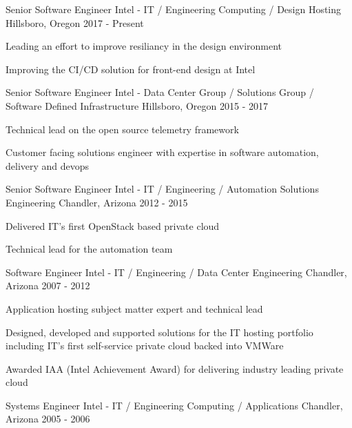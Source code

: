 \begin{cventries}
  \cventry
    {Senior Software Engineer}
    {Intel - IT / Engineering Computing / Design Hosting}
    {Hillsboro, Oregon}
    {2017 - Present}
    {
      \begin{cvitems}
        \item {Leading an effort to improve resiliancy in the design environment}
        \item {Improving the CI/CD solution for front-end design at Intel}
      \end{cvitems}
    }
  \cventry
    {Senior Software Engineer}
    {Intel - Data Center Group / Solutions Group / Software Defined Infrastructure}
    {Hillsboro, Oregon}
    {2015 - 2017}
    {
      \begin{cvitems}
        \item {Technical lead on the open source {} telemetry framework}
        \item {Customer facing solutions engineer with expertise in software automation, delivery and devops}
      \end{cvitems}
    }
  \cventry
    {Senior Software Engineer}
    {Intel - IT / Engineering / Automation Solutions Engineering }
    {Chandler, Arizona}
    {2012 - 2015}
    {
      \begin{cvitems}
	    \item {Delivered IT's first OpenStack based private cloud}
      \item {Technical lead for the automation team}      
      \end{cvitems}
    }
  \cventry
    {Software Engineer}
    {Intel - IT / Engineering / Data Center Engineering}
    {Chandler, Arizona}
    {2007 - 2012}
    {
      \begin{cvitems}
      \item {Application hosting subject matter expert and technical lead}
      \item {Designed, developed and supported solutions for the IT hosting portfolio including IT's first self-service private cloud backed into VMWare}
      \item {Awarded IAA (Intel Achievement Award) for delivering industry leading private cloud}
      \end{cvitems}
    }
  \cventry
    {Systems Engineer}
    {Intel - IT / Engineering Computing / Applications }
    {Chandler, Arizona}
    {2005 - 2006}
    {
      \begin{cvitems}

\end{cvitems}}
\end{cventries}
